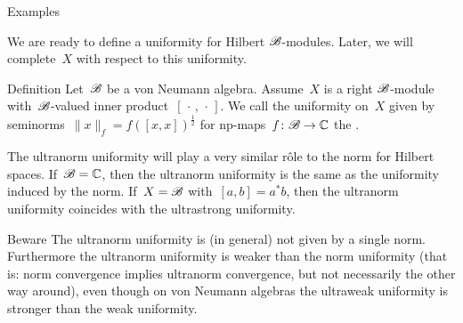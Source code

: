 \documentclass[b]{subfiles}
\begin{document}
\begin{parsec}
\begin{point}{Examples}
\begin{enumerate}
    \end{enumerate}
\begin{point}%
We are ready to define a uniformity for Hilbert $\mathscr{B}$-modules.
Later, we will complete~$X$ with respect to this uniformity.
\end{point}
\end{point}
\begin{point}{Definition}%
Let~$\mathscr{B}$ be a von Neumann algebra.
Assume~$X$ is a right $\mathscr{B}$-module
    with~$\mathscr{B}$-valued inner product~$[\,\cdot\,,\,\cdot\,]$.
We call the uniformity on~$X$
    given by seminorms~$\|x\|_f = f([x,x])^{\frac{1}{2}}$
    for np-maps~$f\colon \mathscr{B} \to \mathbb{C}$
    the .
\begin{point}%
The ultranorm uniformity will play a very similar r\^ole
    to the norm for Hilbert spaces.
If~$\mathscr{B}=\mathbb{C}$, then the ultranorm uniformity is
    the same as the uniformity induced by the norm.
If~$X=\mathscr{B}$ with~$[a,b]=a^*b$,
    then the ultranorm uniformity coincides with the ultrastrong uniformity.
\end{point}
\begin{point}{Beware}%
    The ultranorm uniformity is (in general) not given by a single norm.
    Furthermore the ultranorm uniformity is weaker than the norm uniformity
        (that is: norm convergence implies ultranorm convergence,
            but not necessarily the other way around),
        even though on von Neumann algebras the
        ultraweak uniformity
        is stronger than the weak uniformity.
\end{point}
\end{point}
\end{parsec}
\end{document}
